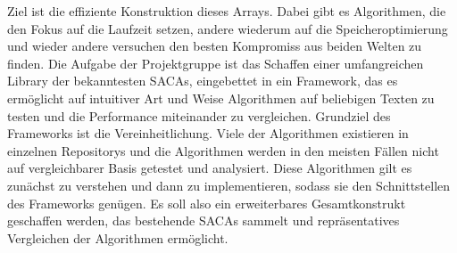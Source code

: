 Ziel ist die effiziente Konstruktion dieses Arrays.
Dabei gibt es Algorithmen, die den Fokus auf die Laufzeit setzen,
andere wiederum auf die Speicheroptimierung und wieder andere versuchen den besten Kompromiss aus beiden Welten zu finden.
Die Aufgabe der Projektgruppe ist das Schaffen einer umfangreichen Library der bekanntesten SACAs,
eingebettet in ein Framework, das es ermöglicht auf intuitiver Art und Weise Algorithmen auf beliebigen
Texten zu testen und die Performance miteinander zu vergleichen. Grundziel des Frameworks ist die Vereinheitlichung.
Viele der Algorithmen existieren in einzelnen Repositorys und die Algorithmen werden in den meisten Fällen 
nicht auf vergleichbarer Basis getestet und analysiert. Diese Algorithmen gilt es zunächst zu verstehen
und dann zu implementieren, sodass sie den Schnittstellen des Frameworks genügen.
Es soll also ein erweiterbares Gesamtkonstrukt geschaffen werden, das bestehende SACAs
sammelt und repräsentatives Vergleichen der Algorithmen ermöglicht.


